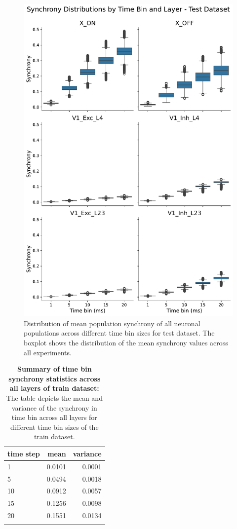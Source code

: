 \begin{figure}
    \centering
    \includegraphics[width=0.92\linewidth]{img/plots/synchrony_boxplot_time_bins_test.pdf}
    \caption{Distribution of mean population synchrony of all neuronal populations across different time bin sizes for test dataset. The boxplot shows the distribution of the mean synchrony values across all experiments.}
    \label{fig:boxplot_synchrony_time_test}
\end{figure}

\begin{table}
    \centering\footnotesize\sf
    \begin{tabular}{lrr}
    \toprule
    time step & mean & variance \\
    \midrule
    1 & 0.0101 & 0.0001 \\
    5 & 0.0494 & 0.0018 \\
    10 & 0.0912 & 0.0057 \\
    15 & 0.1256 & 0.0098 \\
    20 & 0.1551 & 0.0134 \\
    \addlinespace %
    \bottomrule
    \end{tabular}
    \caption{\textbf{Summary of time bin synchrony statistics across all layers of train dataset:} The table depicts the mean and variance of the synchrony in time bin across all layers for different time bin sizes of the train dataset.}
    \label{tab:synchrony_time_bins_summary_train}
\end{table}

